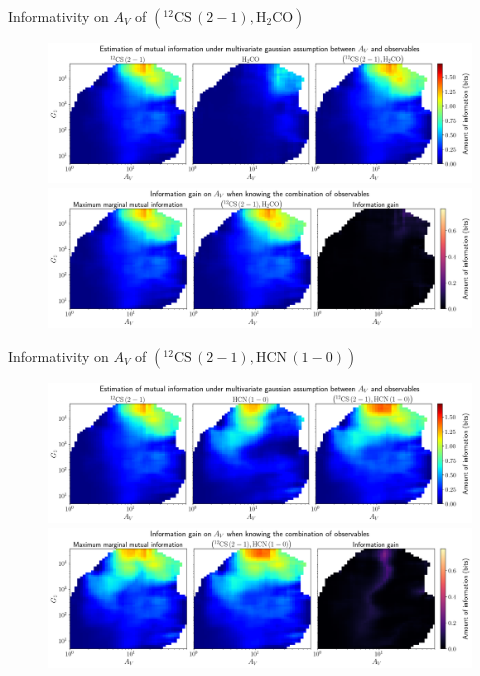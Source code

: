 \documentclass{beamer}
\begin{document}
\begin{frame}{Informativity on $A_V$ of $\left(\mathrm{^{12}CS\,(2-1)},\mathrm{H_2CO}\right)$}
    \begin{figure}
        \centering
        \includegraphics[width=0.95\linewidth]{../linearinfo/av__12cs21_h2co_linearinfo.png}
        \vfill
        \includegraphics[width=0.95\linewidth]{../linearinfo/av__12cs21_h2co_linearinfo_gain.png}
    \end{figure}
\end{frame}

\begin{frame}{Informativity on $A_V$ of $\left(\mathrm{^{12}CS\,(2-1)},\mathrm{HCN\,(1-0)}\right)$}
    \begin{figure}
        \centering
        \includegraphics[width=0.95\linewidth]{../linearinfo/av__12cs21_hcn10_linearinfo.png}
        \vfill
        \includegraphics[width=0.95\linewidth]{../linearinfo/av__12cs21_hcn10_linearinfo_gain.png}
    \end{figure}
\end{frame}
\end{document}
